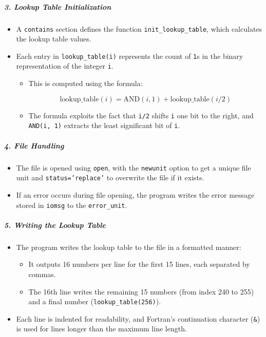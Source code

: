 \subparagraph{\textbf{3. Lookup Table Initialization}}

\begin{itemize}
\item A \texttt{contains} section defines the function \texttt{init\_lookup\_table}, which calculates the lookup table values.
\item Each entry in \texttt{lookup\_table(i)} represents the count of \texttt{1}s in the binary representation of the integer \texttt{i}.

\begin{itemize}
\item This is computed using the formula:

\begin{equation}
\text{lookup\_table}(i) = \text{AND}(i, 1) + \text{lookup\_table}(i/2)
\end{equation}


\item The formula exploits the fact that \texttt{i/2} shifts \texttt{i} one bit to the right, and \texttt{AND(i, 1)} extracts the least significant bit of \texttt{i}.
\end{itemize}
\end{itemize}

\subparagraph{\textbf{4. File Handling}}

\begin{itemize}
\item The file is opened using \texttt{open}, with the \texttt{newunit} option to get a unique file unit and \texttt{status='replace'} to overwrite the file if it exists.
\item If an error occurs during file opening, the program writes the error message stored in \texttt{iomsg} to the \texttt{error\_unit}.
\end{itemize}

\subparagraph{\textbf{5. Writing the Lookup Table}}

\begin{itemize}
\item The program writes the lookup table to the file in a formatted manner:

\begin{itemize}
\item It outputs 16 numbers per line for the first 15 lines, each separated by commas.
\item The 16th line writes the remaining 15 numbers (from index 240 to 255) and a final number (\texttt{lookup\_table(256)}).
\end{itemize}


\item Each line is indented for readability, and Fortran's continuation character (\texttt{\&}) is used for lines longer than the maximum line length.
\end{itemize}

